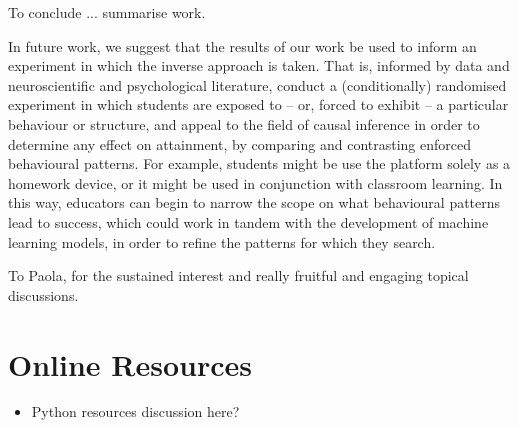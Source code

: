 \documentclass[sigplan,screen]{acmart}
\begin{document}
{\color{red} To conclude ... summarise work}.

In future work, we suggest that the results of our work be used to inform an experiment in which the inverse approach is taken. That is, informed by data and neuroscientific and psychological literature, conduct a (conditionally) randomised experiment in which students are exposed to -- or, forced to exhibit -- a particular behaviour or structure, and appeal to the field of causal inference in order to determine any effect on attainment, by comparing and contrasting enforced behavioural patterns. For example, students might be use the platform solely as a homework device, or it might be used in conjunction with classroom learning. In this way, educators can begin to narrow the scope on what behavioural patterns lead to success, which could work in tandem with the development of machine learning models, in order to refine the patterns for which they search. 



\begin{acks}
To Paola, for the sustained interest and really fruitful and engaging topical discussions.
\end{acks}





\appendix

\section{Online Resources}

\begin{itemize}
    \item Python resources discussion here?
\end{itemize}
\end{document}
